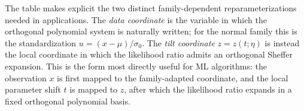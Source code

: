 \documentclass[a4paper,11pt]{article}
\numberwithin{equation}{section}
\theoremstyle{plain}
\theoremstyle{definition}
\theoremstyle{remark}
\newcommand{\1}{\ensuremath{\mathds{1}}\xspace}
\begin{document}
The table makes explicit the two distinct family-dependent reparameterizations
needed in applications. The \emph{data coordinate} is the variable in which the
orthogonal polynomial system is naturally written; for the normal family this is
the standardization \(u=(x-\mu)/\sigma_0\). The \emph{tilt coordinate}
\(z=z(t;\eta)\) is instead the local coordinate in which the likelihood ratio
admits an orthogonal Sheffer expansion. This is the form most directly useful
for ML algorithms: the observation \(x\) is first mapped to the family-adapted
coordinate, and the local parameter shift \(t\) is mapped to \(z\), after which
the likelihood ratio expands in a fixed orthogonal polynomial basis.




\end{document}
